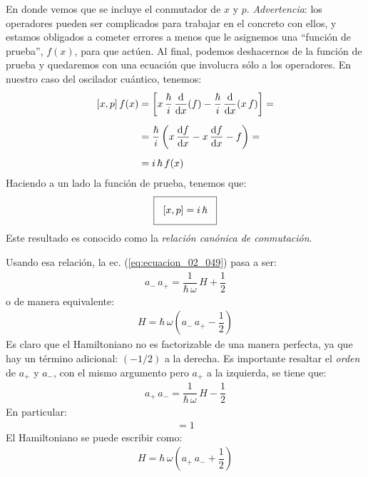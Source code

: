 \documentclass[12pt]{article}
\numberwithin{equation}{section}
\begin{document}
En donde vemos que se incluye el conmutador de $x$ y $p$. 
\emph{Advertencia}: los operadores pueden ser complicados para trabajar en el concreto con ellos, y estamos obligados a cometer errores a menos que le asignemos una \enquote{función de prueba}, $f (x)$, para que actúen. Al final, podemos deshacernos de la función de prueba y quedaremos con una ecuación que involucra sólo a los operadores. En nuestro caso del oscilador cuántico, tenemos:
\begin{align}
\begin{aligned}[b]
[x, p] \, f(x) &= \left[ x \, \dfrac{\hbar}{i} \, \dv{x} (f) - \dfrac{\hbar}{i} \, \dv{x} (x \, f) \right] = \\[0.5em]
&= \dfrac{\hbar}{i} \left( x \, \dv{f}{x} - x \,\dv{f}{x} - f \right) = \\[0.5em]
&= i \, \hbar \, f(x)
\end{aligned}
\label{eq:ecuacion_02_050}
\end{align}
Haciendo a un lado la función de prueba, tenemos que:
\begin{align}
\setlength{\fboxsep}{3\fboxsep}\boxed{
[x, p] = i \, \hbar
}
\label{eq:ecuacion_02_051}
\end{align}
Este resultado es conocido como la \emph{relación canónica de conmutación}.
\par
Usando esa relación, la ec. (\ref{eq:ecuacion_02_049}) pasa a ser:
\begin{align}
a_{-} \, a_{+} = \dfrac{1}{\hbar \, \omega} \, H + \dfrac{1}{2}
\label{ec:ecuacion_02_052}
\end{align}
o de manera equivalente:
\begin{align}
H = \hbar \, \omega \left( a_{-} \, a_{+} - \dfrac{1}{2} \right)
\label{ec:ecuacion_02_053}
\end{align}
Es claro que el Hamiltoniano no es factorizable de una manera perfecta, ya que hay un término adicional: $(-1/2)$ a la derecha. Es importante resaltar el \emph{orden} de $a_{+}$ y $a_{-}$, con el mismo argumento pero $a_{+}$ a la izquierda, se tiene que:
\begin{align}
a_{+} \, a_{-} = \dfrac{1}{\hbar \, \omega} \, H - \dfrac{1}{2}
\label{eq:ecuacion_02_054}
\end{align}
En particular:
\begin{align}
[a_{-}, a_{+}] = 1
\label{eq:ecuacion_02_55}
\end{align}
El Hamiltoniano se puede escribir como:
\begin{align}
H = \hbar \, \omega \left( a_{+} \, a_{-} +\dfrac{1}{2} \right)
\label{eq:ecuacion_02_056}
\end{align}
\end{document}
